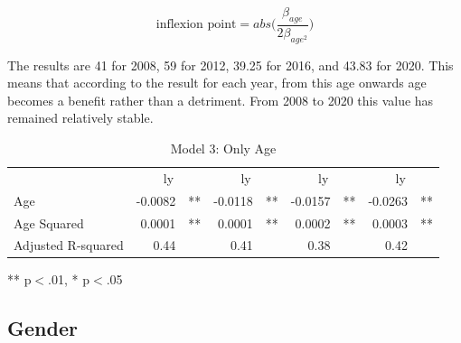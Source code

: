 \documentclass[12pt]{article}
\begin{document}
\begin{spacing}{1.5}
\begin{equation}
	\mbox{inflexion point} = abs \bigg(\frac{{\beta}_{age}}{2 {\beta}_{age^2}} \bigg)
\end{equation}

The results are 41 for 2008, 59 for 2012, 39.25 for 2016, and 43.83 for 2020. This means that according to the result for each year, from this age onwards age becomes a benefit rather than a detriment. From 2008 to 2020 this value has remained relatively stable.

\begin{table}[!h]
\caption{Model 3: Only Age}
\centering
\begin{tabular}{lllllllll}
\cline{1-9}
\multicolumn{1}{r}{} &
  \multicolumn{2}{c}{ly} &
  \multicolumn{2}{c}{ly} &
  \multicolumn{2}{c}{ly} &
  \multicolumn{2}{c}{ly} \\
\cline{1-9}
\multicolumn{1}{l}{Age} &
  \multicolumn{1}{r}{-0.0082} &
  \multicolumn{1}{l}{**} &
  \multicolumn{1}{r}{-0.0118} &
  \multicolumn{1}{l}{**} &
  \multicolumn{1}{r}{-0.0157} &
  \multicolumn{1}{l}{**} &
  \multicolumn{1}{r}{-0.0263} &
  \multicolumn{1}{l}{**} \\
\multicolumn{1}{l}{Age Squared} &
  \multicolumn{1}{r}{0.0001} &
  \multicolumn{1}{l}{**} &
  \multicolumn{1}{r}{0.0001} &
  \multicolumn{1}{l}{**} &
  \multicolumn{1}{r}{0.0002} &
  \multicolumn{1}{l}{**} &
  \multicolumn{1}{r}{0.0003} &
  \multicolumn{1}{l}{**} \\
\multicolumn{1}{l}{Adjusted R-squared} &
  \multicolumn{1}{r}{0.44} &
  \multicolumn{1}{l}{} &
  \multicolumn{1}{r}{0.41} &
  \multicolumn{1}{l}{} &
  \multicolumn{1}{r}{0.38} &
  \multicolumn{1}{l}{} &
  \multicolumn{1}{r}{0.42} &
  \multicolumn{1}{l}{} \\
\cline{1-9}
\end{tabular}

\footnotesize{
** p$<$.01, * p$<$.05
}
\label{table:age2}
\end{table}

\end{spacing}

\subsection{Gender}
\end{document}

